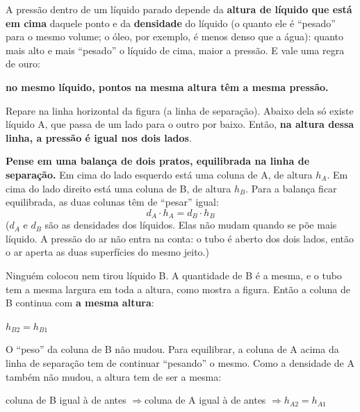 \begin{enunciado}

\end{enunciado}


\begin{ideia}
A pressão dentro de um líquido parado depende da \textbf{altura de líquido que está em cima} daquele ponto e da
\textbf{densidade} do líquido (o quanto ele é ``pesado'' para o mesmo volume; o óleo, por exemplo, é menos denso que a água): quanto mais alto e mais ``pesado'' o líquido de cima, maior a pressão. E vale uma regra de ouro:
\begin{center}\textbf{no mesmo líquido, pontos na mesma altura têm a mesma pressão.}\end{center}
Repare na linha horizontal da figura (a linha de separação). Abaixo dela só existe líquido A, que passa de um lado para o outro
por baixo. Então, \textbf{na altura dessa linha, a pressão é igual nos dois lados}.

\textbf{Pense em uma balança de dois pratos, equilibrada na linha de separação.} Em cima do lado esquerdo está uma coluna
de A, de altura $h_A$. Em cima do lado direito está uma coluna de B, de altura $h_B$. Para a balança ficar equilibrada,
as duas colunas têm de ``pesar'' igual:
\[ d_A \cdot h_A = d_B \cdot h_B \]
($d_A$ e $d_B$ são as densidades dos líquidos. Elas não mudam quando se põe mais líquido. A pressão do ar não entra na
conta: o tubo é aberto dos dois lados, então o ar aperta as duas superfícies do mesmo jeito.)
\end{ideia}

\passoapasso
{}
Ninguém colocou nem tirou líquido B. A quantidade de B é a mesma, e o tubo tem a mesma largura em toda a altura, como mostra a figura.
Então a coluna de B continua com \textbf{a mesma altura}:
\begin{conta}
$h_{B2} = h_{B1}$
\end{conta}

O ``peso'' da coluna de B não mudou. Para equilibrar, a coluna de A acima da linha de separação tem de continuar ``pesando'' o mesmo.
Como a densidade de A também não mudou, a altura tem de ser a mesma:
\begin{conta}
coluna de B igual à de antes \quad$\Rightarrow$\quad coluna de A igual à de antes \quad$\Rightarrow$\quad $h_{A2} = h_{A1}$
\end{conta}

